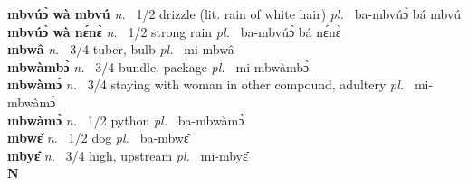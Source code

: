 {\bfseries mbvúɔ̀ wà mbvú}  {\itshape  n.~} 1/2 drizzle (lit. rain of white hair) {\itshape pl.~} ba-mbvúɔ̀ bá mbvú    \\ 
{\bfseries mbvúɔ̀ wà nɛ́nɛ̀}  {\itshape n.~} 1/2 strong rain {\itshape pl.~} ba-mbvúɔ̀ bá nɛ́nɛ̀    \\ 
{\bfseries mbwâ}  {\itshape n.~} 3/4 tuber, bulb {\itshape pl.~} mi-mbwâ    \\ 
{\bfseries mbwàmbɔ̀}  {\itshape n.~} 3/4 bundle, package {\itshape pl.~} mi-mbwàmbɔ̀    \\ 
{\bfseries mbwàmɔ̀}  {\itshape n.~} 3/4 staying with woman in other compound, adultery {\itshape pl.~} mi-mbwàmɔ̀    \\ 
{\bfseries mbwàmɔ̀}  {\itshape n.~} 1/2 python {\itshape pl.~} ba-mbwàmɔ̀    \\ 
{\bfseries mbwɛ̌}  {\itshape n.~} 1/2 dog {\itshape pl.~} ba-mbwɛ̌    \\ 
{\bfseries mbyɛ̂}  {\itshape n.~} 3/4 high, upstream {\itshape pl.~} mi-mbyɛ̂    \\ 

\medskip
\noindent \large {\bfseries N}\normalsize\\
\medskip

